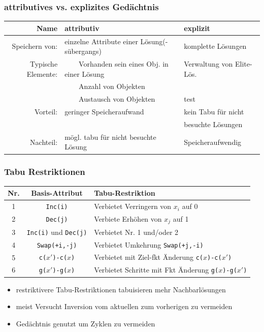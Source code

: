 \documentclass[12pt]{article}
\newcommand{\tabitem}{~~\llap{\textbullet}~~}
\begin{document}
			\subsubsection{attributives vs. explizites Gedächtnis}
				\begin{tabular}{r|l l}
					Name & attributiv 		& explizit \\ \hline
					Speichern von: & einzelne Attribute einer Lösung(-sübergangs) & komplette Lösungen \\
					Typische Elemente: 	& \tabitem Vorhanden sein eines Obj. in einer Lösung 	& Verwaltung von Elite-Lös.\\
										& \tabitem Anzahl von Objekten							& \\
										& \tabitem Austausch von Objekten 						&  test\\
					Vorteil: 			& geringer Speicheraufwand								& kein Tabu für nicht \\
										&														& besuchte Lösungen\\
					Nachteil:			& mögl. tabu für nicht besuchte Lösung					& Speicheraufwendig
				\end{tabular}
			\subsubsection{Tabu Restriktionen}
				\begin{tabular}{ c c l}
					Nr. & Basis-Attribut & Tabu-Restriktion \\ \hline
					1 & \texttt{Inc(i)} & Verbietet Verringern von $x_i$ auf 0 \\
					2 & \texttt{Dec(j)} & Verbiete Erhöhen von $x_j$ auf 1 \\
					3 & \texttt{Inc(i)} und \texttt{Dec(j)} & Verbietet Nr. 1 und/oder 2 \\
					4 & \texttt{Swap(+i,-j)} & Verbietet Umkehrung \texttt{Swap(+j,-i)} \\
					5 & \texttt{c($x'$)-c($x$)} & Verbietet mit Ziel-fkt Änderung \texttt{c($x$)-c($x'$)} \\
					6 & \texttt{g($x'$)-g($x$)} & Verbietet Schritte mit Fkt Änderung \texttt{g($x$)-g($x'$)}
				\end{tabular}
				\begin{itemize}
					\item restriktivere Tabu-Restriktionen tabuisieren mehr Nachbarlösungen
					\item meist Versucht Inversion vom aktuellen zum vorherigen zu vermeiden
					\item Gedächtnis genutzt um Zyklen zu vermeiden
				\end{itemize}
\end{document}
